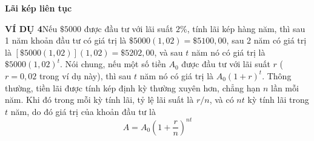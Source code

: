 \vspace{1.5em}
\noindent{\textcolor{stewartblue}{\rule{1.2ex}{1.2ex}}}\hspace{0.5em}\textbf{\large Lãi kép liên tục}
\vspace{0.6em}

\noindent\textbf{\textcolor{stewartblue}{VÍ DỤ 4}}\hspace{0.8em}Nếu $\$5000$ được đầu tư với lãi suất $2\%$, tính lãi kép hàng năm, thì sau 1 năm khoản đầu tư có giá trị là $\$5000(1{,}02) = \$5100{,}00$, sau 2 năm có giá trị là $[\$5000(1{,}02)](1{,}02) = \$5202{,}00$, và sau $t$ năm nó có giá trị là $\$5000(1{,}02)^t$. Nói chung, nếu một số tiền $A_0$ được đầu tư với lãi suất $r$ ($r = 0{,}02$ trong ví dụ này), thì sau $t$ năm nó có giá trị là $A_0(1 + r)^t$. Thông thường, tiền lãi được tính kép định kỳ thường xuyên hơn, chẳng hạn $n$ lần mỗi năm. Khi đó trong mỗi kỳ tính lãi, tỷ lệ lãi suất là $r/n$, và có $nt$ kỳ tính lãi trong $t$ năm, do đó giá trị của khoản đầu tư là
\begin{equation*}
A = A_0 \left(1 + \frac{r}{n}\right)^{nt}
\end{equation*}

